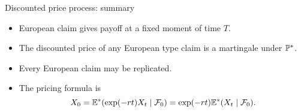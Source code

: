 \begin{frame}{Discounted price process: summary}
  
  \begin{itemize}[<+->]
      \item \alert{European claim} gives payoff at a fixed moment of time $T$.
      \item The \alert{discounted price} of any European type claim is 
      a martingale under $\P^*$.
      \item Every European claim may be \alert{replicated}.
      \item The \alert{pricing formula} is
      \[
        X_0 = \E^*(\exp(-rt)X_t\mid \cF_0) = \exp(-rt) \E^*(X_t \mid \cF_0).  
      \] 
  \end{itemize}
    
\end{frame}
  